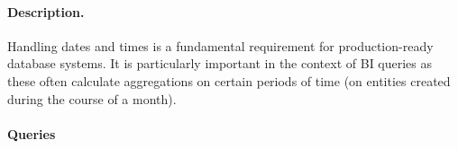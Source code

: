 
\paragraph{Description.}

Handling dates and times is a fundamental requirement for production-ready
database systems. It is particularly important in the context of BI queries as
these often calculate aggregations on certain periods of time (\eg on entities
created during the course of a month).


\paragraph{Queries}
{\raggedright
}
